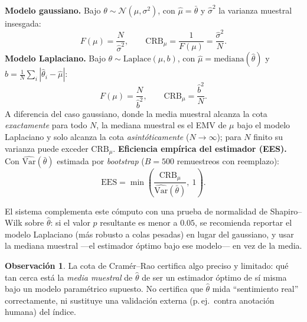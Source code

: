 \documentclass[11pt,a4paper,oneside]{article}
\theoremstyle{definition}
\newtheorem{remark}[definition]{Observación}
\begin{document}
\begin{summaryBox}
\textbf{Modelo gaussiano.} Bajo $\theta\sim\mathcal N(\mu,\sigma^2)$, con
$\hat\mu=\bar\theta$ y $\hat\sigma^2$ la varianza muestral insesgada:
\[
F(\mu) = \frac{N}{\hat\sigma^2}, \qquad
\mathrm{CRB}_\mu = \frac{1}{F(\mu)} = \frac{\hat\sigma^2}{N}.
\]
\textbf{Modelo Laplaciano.} Bajo $\theta\sim\mathrm{Laplace}(\mu,b)$, con $\hat\mu=\mathrm{mediana}(\hat\theta)$
y $\hat b = \frac1N\sum_i |\hat\theta_i-\hat\mu|$:
\[
F(\mu) = \frac{N}{\hat b^2}, \qquad
\mathrm{CRB}_\mu = \frac{\hat b^2}{N}.
\]
A diferencia del caso gaussiano, donde la media muestral alcanza la cota \emph{exactamente} para
todo $N$, la mediana muestral es el EMV de $\mu$ bajo el modelo Laplaciano y solo alcanza la
cota \emph{asintóticamente} ($N\to\infty$); para $N$ finito su varianza puede exceder
$\mathrm{CRB}_\mu$.
\textbf{Eficiencia empírica del estimador (EES).} Con $\widehat{\mathrm{Var}}(\bar\theta)$
estimada por \emph{bootstrap} \cite{Efron1979} ($B=500$ remuestreos con reemplazo):
\[
\mathrm{EES} = \min\!\left(\frac{\mathrm{CRB}_\mu}{\widehat{\mathrm{Var}}(\bar\theta)},\ 1\right).
\]
\end{summaryBox}

El sistema complementa este cómputo con una prueba de normalidad de Shapiro--Wilk
\cite{ShapiroWilk1965} sobre $\hat\theta$: si el valor $p$ resultante es menor a $0.05$, se
recomienda reportar el modelo Laplaciano (más robusto a colas pesadas) en lugar del gaussiano, y
usar la mediana muestral —el estimador óptimo bajo ese modelo— en vez de la media.

\begin{remark}
La cota de Cramér--Rao certifica algo preciso y limitado: qué tan cerca está la \emph{media
muestral} de $\hat\theta$ de ser un estimador óptimo de sí misma bajo un modelo paramétrico
supuesto. No certifica que $\hat\theta$ mida ``sentimiento real'' correctamente, ni sustituye
una validación externa (p.\,ej.\ contra anotación humana) del índice.
\end{remark}
\end{document}
